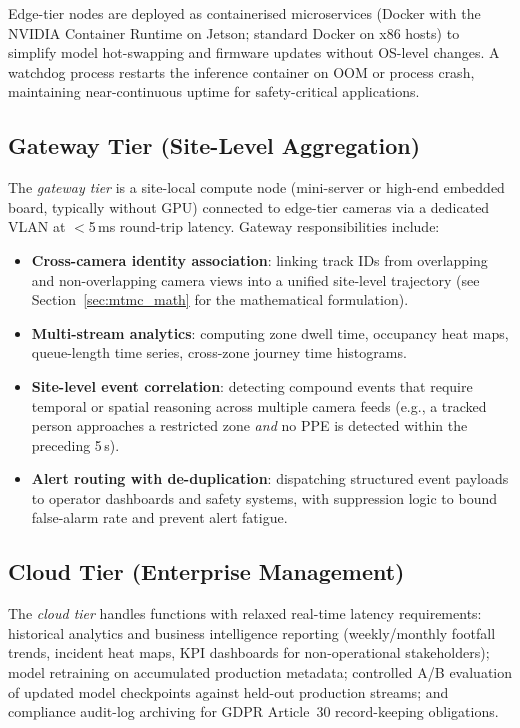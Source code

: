 \documentclass[11pt,a4paper]{article}
\begin{document}
Edge-tier nodes are deployed as containerised microservices (Docker
with the NVIDIA Container Runtime on Jetson; standard Docker on
x86 hosts) to simplify model hot-swapping and firmware updates
without OS-level changes. A watchdog process restarts the inference
container on OOM or process crash, maintaining near-continuous
uptime for safety-critical applications.

\subsection{Gateway Tier (Site-Level Aggregation)}

The \textit{gateway tier} is a site-local compute node (mini-server
or high-end embedded board, typically without GPU) connected to
edge-tier cameras via a dedicated VLAN at $<$5\,ms round-trip latency.
Gateway responsibilities include:

\begin{itemize}[leftmargin=*, noitemsep]
  \item \textbf{Cross-camera identity association}: linking track IDs
    from overlapping and non-overlapping camera views into a unified
    site-level trajectory (see Section~\ref{sec:mtmc_math} for the
    mathematical formulation).
  \item \textbf{Multi-stream analytics}: computing zone dwell time,
    occupancy heat maps, queue-length time series, cross-zone
    journey time histograms.
  \item \textbf{Site-level event correlation}: detecting compound
    events that require temporal or spatial reasoning across multiple
    camera feeds (e.g., a tracked person approaches a restricted zone
    \emph{and} no PPE is detected within the preceding 5\,s).
  \item \textbf{Alert routing with de-duplication}: dispatching
    structured event payloads to operator dashboards and safety
    systems, with suppression logic to bound false-alarm rate and
    prevent alert fatigue.
\end{itemize}

\subsection{Cloud Tier (Enterprise Management)}

The \textit{cloud tier} handles functions with relaxed real-time
latency requirements: historical analytics and business intelligence
reporting (weekly/monthly footfall trends, incident heat maps, KPI
dashboards for non-operational stakeholders); model retraining on
accumulated production metadata; controlled A/B evaluation of updated
model checkpoints against held-out production streams; and compliance
audit-log archiving for GDPR Article~30 record-keeping obligations.
\end{document}

